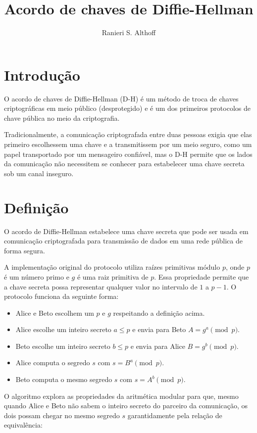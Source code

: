 \documentclass[12pt]{article}
\title{Acordo de chaves de Diffie-Hellman}
\author{Ranieri S. Althoff\inst{1}}
\begin{document}
\maketitle

\section{Introdução}\label{sec:firstpage}

O acordo de chaves de Diffie-Hellman (D-H) é um método de troca de chaves
criptográficas em meio público (desprotegido) e é um dos primeiros protocolos
de chave pública no meio da criptografia.

Tradicionalmente, a comunicação criptografada entre duas pessoas exigia que
elas primeiro escolhessem uma chave e a transmitissem por um meio seguro, como
um papel transportado por um mensageiro confiável, mas o D-H permite que os
lados da comunicação não necessitem se conhecer para estabelecer uma chave
secreta sob um canal inseguro.

\section{Definição}

O acordo de Diffie-Hellman estabelece uma chave secreta que pode ser usada em
comunicação criptografada para transmissão de dados em uma rede pública de
forma segura.

A implementação original do protocolo utiliza raízes primitivas módulo $p$,
onde $p$ é um número primo e $g$ é uma raiz primitiva de $p$. Essa propriedade
permite que a chave secreta possa representar qualquer valor no intervalo de
$1$ a $p-1$. O protocolo funciona da seguinte forma:

\begin{itemize}
    \item Alice e Beto escolhem um $p$ e $g$ respeitando a definição acima.
    \item Alice escolhe um inteiro secreto $a \leq p$ e envia para Beto
        $A = g^{a} \pmod{p}$.
    \item Beto escolhe um inteiro secreto $b \leq p$ e envia para Alice
        $B = g^{b} \pmod{p}$.
    \item Alice computa o segredo $s$ com $s = B^{a} \pmod{p}$.
    \item Beto computa o mesmo segredo $s$ com $s = A^{b} \pmod{p}$.
\end{itemize}

O algoritmo explora as propriedades da aritmética modular para que, mesmo
quando Alice e Beto não sabem o inteiro secreto do parceiro da comunicação, os
dois possam chegar no mesmo segredo $s$ garantidamente pela relação de
equivalência:
\end{document}
